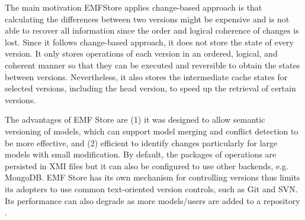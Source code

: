 The main motivation EMFStore applies change-based approach is that calculating the differences between two versions might be expensive and is not able to recover all information since the order and logical coherence of changes is lost. Since it follows change-based approach, it does not store the state of every version. It only stores operations of each version in an ordered, logical, and coherent manner so that they can be executed and reversible to obtain the states between versions. Nevertheless, it also stores the intermediate cache states for selected versions, including the head version, to speed up the retrieval of certain versions.

The advantages of EMF Store are (1) it was designed to allow semantic versioning of models, which can support model merging and conflict detection to be more effective, and (2) efficient to identify changes particularly for large models with small modification. By default, the packages of operations are persisted in XMI files but it can also be configured to use other backends, e.g. MongoDB. EMF Store has its own mechanism for controlling versions thus limits its adopters to use common text-oriented version controls, such as Git and SVN. Its performance can also degrade as more models/users are added to a repository \cite{KolovosRMPGCLRV13}. 

